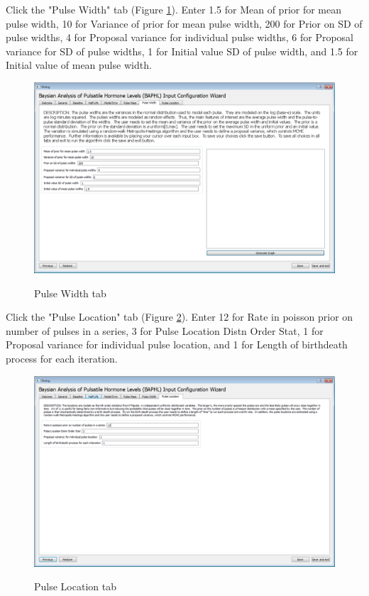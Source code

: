 \documentclass[11pt]{book}
\begin{document}
Click the "Pulse Width" tab (Figure \ref{pulsewidth}). Enter 1.5 for Mean of prior for mean pulse width, 10 for Variance of prior for mean pulse width, 200 for Prior on SD of pulse widths, 4 for Proposal variance for individual pulse widths, 6 for Proposal variance for SD of pulse widths, 1 for Initial value SD of pulse width, and 1.5 for Initial value of mean pulse width.

\begin{figure}
  \centering
  \includegraphics[width=\textwidth]{pulsewidthtab.PNG}\\
  \caption{Pulse Width tab}\label{pulsewidth}
\end{figure}

Click the "Pulse Location" tab (Figure \ref{pulselocation}). Enter 12 for Rate in poisson prior on number of pulses in a series, 3 for Pulse Location Distn Order Stat, 1 for Proposal variance for individual pulse location, and 1 for Length of birthdeath process for each iteration.

\begin{figure}
  \centering
  \includegraphics[width=\textwidth]{pulselocationtab.PNG}\\
  \caption{Pulse Location tab}\label{pulselocation}
\end{figure}
\end{document}
